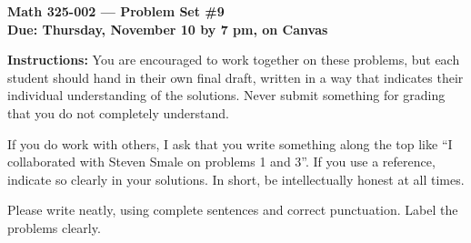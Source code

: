 \documentclass{amsart}
\begin{document}
\begin{center}
{\large\bfseries
Math 325-002 --- Problem Set \#9 \\
Due: Thursday, November 10 by 7 pm, on Canvas}
\end{center}





{\bf Instructions:} You are encouraged to work together on these
problems, but each student should hand in their own final draft,
written in a way that indicates their individual understanding of
the solutions. Never submit something for grading
that you do not completely understand. 

If you do work with others, I ask that you write something along the
top like ``I collaborated with Steven Smale on problems 1 and 3''.
If you use a reference, indicate so clearly in your solutions. 
In short, be intellectually
honest at all times.

Please write neatly, using complete sentences and correct
punctuation. Label the problems clearly. 
\end{document}
